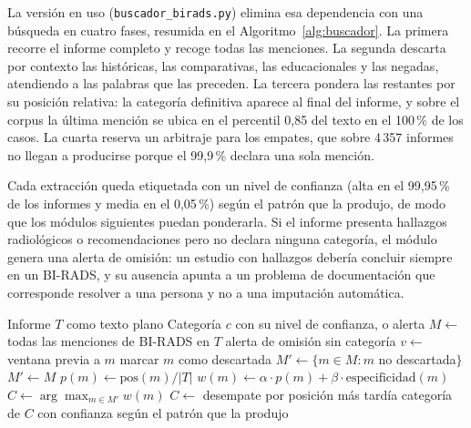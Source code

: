 \documentclass[10pt,journal,a4paper]{IEEEtran}
\newcommand{\codename}[1]{\texttt{#1}}
\begin{document}
La versi\'on en uso (\codename{buscador\_birads.py}) elimina esa dependencia con una b\'usqueda en cuatro fases, resumida en el Algoritmo~\ref{alg:buscador}. La primera recorre el informe completo y recoge todas las menciones. La segunda descarta por contexto las hist\'oricas, las comparativas, las educacionales y las negadas, atendiendo a las palabras que las preceden. La tercera pondera las restantes por su posici\'on relativa: la categor\'ia definitiva aparece al final del informe, y sobre el corpus la \'ultima menci\'on se ubica en el percentil 0,85 del texto en el 100\,\% de los casos. La cuarta reserva un arbitraje para los empates, que sobre 4\,357 informes no llegan a producirse porque el 99,9\,\% declara una sola menci\'on.

Cada extracci\'on queda etiquetada con un nivel de confianza (alta en el 99,95\,\% de los informes y media en el 0,05\,\%) seg\'un el patr\'on que la produjo, de modo que los m\'odulos siguientes puedan ponderarla. Si el informe presenta hallazgos radiol\'ogicos o recomendaciones pero no declara ninguna categor\'ia, el m\'odulo genera una alerta de omisi\'on: un estudio con hallazgos deber\'ia concluir siempre en un BI-RADS, y su ausencia apunta a un problema de documentaci\'on que corresponde resolver a una persona y no a una imputaci\'on autom\'atica.

\begin{algorithm}[!t]
\caption{B\'usqueda h\'ibrida de la categor\'ia BI-RADS}
\label{alg:buscador}
\begin{algorithmic}[1]
\Require Informe $T$ como texto plano
\Ensure Categor\'ia $c$ con su nivel de confianza, o alerta
\State $M \gets$ todas las menciones de BI-RADS en $T$ 
    \State \Return alerta de omisi\'on 
  \Else
    \State \Return sin categor\'ia
  \EndIf
\EndIf
{} 
  \State $v \gets$ ventana previa a $m$
    \State marcar $m$ como descartada
  \EndIf
\EndFor
\State $M' \gets \{m \in M : m$ no descartada$\}$
  \State $M' \gets M$ 
\EndIf
{} 
  \State $p(m) \gets \mathrm{pos}(m) / |T|$
  \State $w(m) \gets \alpha \cdot p(m) + \beta \cdot \mathrm{especificidad}(m)$
\EndFor
\State $C \gets \arg\max_{m \in M'} w(m)$
 
  \State $C \gets$ desempate por posici\'on m\'as tard\'ia
\EndIf
\State \Return categor\'ia de $C$ con confianza seg\'un el patr\'on que la produjo
\end{algorithmic}
\end{algorithm}
\end{document}
